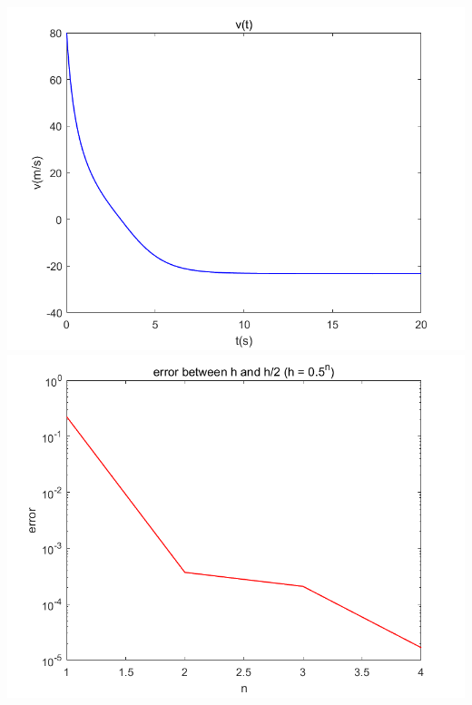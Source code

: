\documentclass{article}
\begin{document}
\begin{flushleft}
\begin{enumerate}
\begin{framed}
\begin{multicols}{2}
\includegraphics[width={\linewidth}]{Q2_b.png}
\columnbreak
\includegraphics[width={\linewidth}]{Q2_b_e.png}
\end{multicols}

\newpage%


\end{framed}
\end{enumerate}
\end{flushleft}
\end{document}
